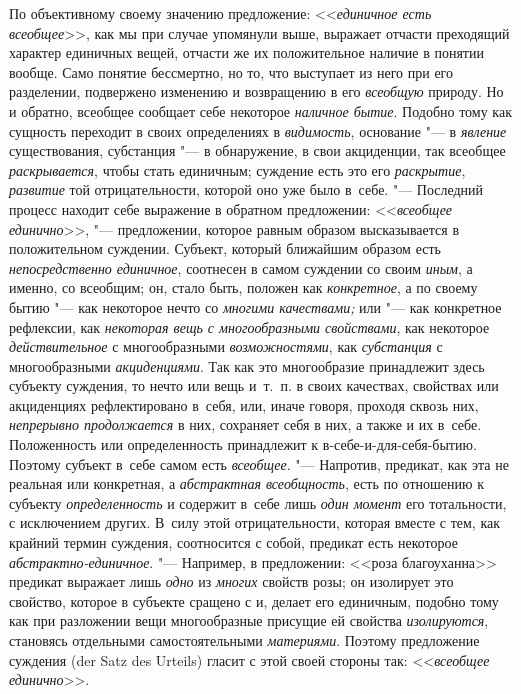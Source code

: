По объективному своему значению предложение: <<{\em единичное есть всеобщее}>>,
как мы при случае упомянули выше, выражает отчасти преходящий характер
единичных вещей, отчасти же их положительное наличие в понятии вообще. Само
понятие бессмертно, но то, что выступает из него при его разделении, подвержено
изменению и возвращению в его {\em всеобщую} природу. Но и обратно, всеобщее
сообщает себе некоторое {\em наличное бытие}. Подобно тому как сущность
переходит в своих определениях в {\em видимость}, основание "---
в {\em явление} существования, субстанция "--- в обнаружение, в свои
акциденции, так всеобщее {\em раскрывается}, чтобы стать единичным; суждение
есть это его {\em раскрытие}, {\em развитие} той отрицательности, которой оно
уже было в~себе. "--- Последний процесс находит себе выражение в обратном
предложении: <<{\em всеобщее единично}>>, "--- предложении, которое равным
образом высказывается в положительном суждении. Субъект, который ближайшим
образом есть {\em непосредственно единичное}, соотнесен в самом суждении со
своим {\em иным}, а именно, со всеобщим; он, стало быть, положен как
{\em конкретное}, а по своему бытию "--- как некоторое нечто со
{\em многими качествами;} или "--- как конкретное рефлексии, как {\em некоторая
вещь с многообразными свойствами}, как некоторое {\em действительное}
с многообразными {\em возможностями}, как {\em субстанция} с многообразными
{\em акциденциями}. Так как это многообразие принадлежит здесь субъекту
суждения, то нечто или вещь и~т.~п. в своих качествах, свойствах или
акциденциях рефлектировано в~себя, или, иначе говоря, проходя сквозь них,
{\em непрерывно продолжается} в них, сохраняет себя в них, а также и их в~себе.
Положенность или определенность принадлежит к в-себе-и-для-себя-бытию. Поэтому
субъект в~себе самом есть {\em всеобщее}. "--- Напротив, предикат, как эта не
реальная или конкретная, а {\em абстрактная всеобщность}, есть по отношению к
субъекту {\em определенность} и содержит в~себе лишь {\em один момент} его
тотальности, с исключением других. В~силу этой отрицательности, которая вместе
с тем, как крайний термин суждения, соотносится с собой, предикат есть
некоторое {\em абстрактно-единичное}. "--- Например, в предложении: <<роза
благоуханна>> предикат выражает лишь {\em одно} из {\em многих} свойств розы;
он изолирует это свойство, которое в субъекте сращено с и, делает его
единичным, подобно тому как при разложении вещи многообразные присущие ей
свойства {\em изолируются}, становясь отдельными самостоятельными
{\em материями}. Поэтому предложение суждения (der Satz des
Urteils) гласит с этой своей стороны так: <<{\em всеобщее единично}>>.


